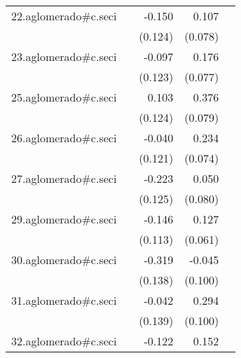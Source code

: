 {\begin{longtable}{l*{4}{D{.}{.}{-1}}}
\addlinespace
22.aglomerado#c.seci&                     &      -0.150         &       0.107         &                     \\
            &                     &     (0.124)         &     (0.078)         &                     \\
\addlinespace
23.aglomerado#c.seci&                     &      -0.097         &       0.176\sym{*}  &                     \\
            &                     &     (0.123)         &     (0.077)         &                     \\
\addlinespace
25.aglomerado#c.seci&                     &       0.103         &       0.376\sym{***}&                     \\
            &                     &     (0.124)         &     (0.079)         &                     \\
\addlinespace
26.aglomerado#c.seci&                     &      -0.040         &       0.234\sym{**} &                     \\
            &                     &     (0.121)         &     (0.074)         &                     \\
\addlinespace
27.aglomerado#c.seci&                     &      -0.223         &       0.050         &                     \\
            &                     &     (0.125)         &     (0.080)         &                     \\
\addlinespace
29.aglomerado#c.seci&                     &      -0.146         &       0.127\sym{*}  &                     \\
            &                     &     (0.113)         &     (0.061)         &                     \\
\addlinespace
30.aglomerado#c.seci&                     &      -0.319\sym{*}  &      -0.045         &                     \\
            &                     &     (0.138)         &     (0.100)         &                     \\
\addlinespace
31.aglomerado#c.seci&                     &      -0.042         &       0.294\sym{**} &                     \\
            &                     &     (0.139)         &     (0.100)         &                     \\
\addlinespace
32.aglomerado#c.seci&                     &      -0.122         &       0.152         &                     \\

\end{longtable}}
